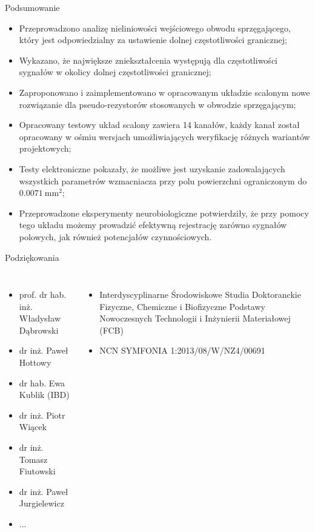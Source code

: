     \begin{frame}{Podsumowanie}
    \begin{itemize}
        \item Przeprowadzono analizę nieliniowości wejściowego obwodu sprzęgającego, który jest odpowiedzialny za ustawienie dolnej częstotliwości granicznej;
        \item Wykazano, że największe zniekształcenia występują dla częstotliwości sygnałów w okolicy dolnej częstotliwości granicznej;
        \item Zaproponowano i zaimplementowano w opracowanym układzie scalonym nowe rozwiązanie dla pseudo-rezystorów stosowanych w obwodzie sprzęgającym;
        \item Opracowany testowy układ scalony zawiera 14 kanałów, każdy kanał został opracowany w ośmiu wersjach umożliwiających weryfikację różnych wariantów projektowych;
        \item Testy elektroniczne pokazały, że możliwe jest uzyskanie zadowalających wszystkich parametrów wzmacniacza  przy polu powierzchni  ograniczonym do $\SI{0.0071}{\milli\metre\squared}$;
        \item Przeprowadzone eksperymenty neurobiologiczne potwierdziły, że przy pomocy tego układu możemy prowadzić efektywną rejestrację zarówno sygnałów polowych, jak również potencjałów czynnościowych.
    \end{itemize}
    \end{frame}

    \begin{frame}{Podziękowania}
      
      \begin{columns}

        \begin{itemize}
          \item prof. dr hab. inż. Władysław Dąbrowski
          \item dr inż. Paweł Hottowy
          \item dr hab. Ewa Kublik (IBD)
          \item dr inż. Piotr Wiącek
          \item dr inż. Tomasz Fiutowski
          \item dr inż. Paweł Jurgielewicz
          \item ...
        \end{itemize}
    
        \begin{itemize}
          \item Interdyscyplinarne Środowiskowe Studia Doktoranckie Fizyczne, Chemiczne i Biofizyczne Podstawy Nowoczesnych
          Technologii i Inżynierii Materiałowej (FCB)
          \item NCN SYMFONIA 1:2013/08/W/NZ4/00691
        \end{itemize}
    \end{columns}
    \end{frame}